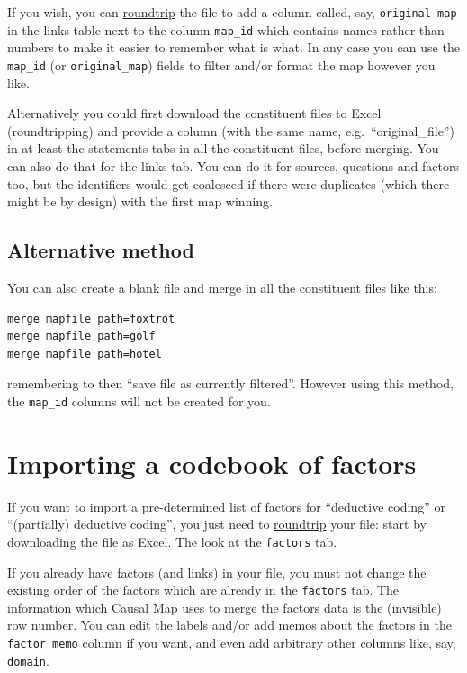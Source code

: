 \documentclass[
]{book}
\begin{document}
If you wish, you can \protect\hyperlink{xroundtripping}{roundtrip} the file to add a column called, say, \texttt{original\ map} in the links table next to the column \texttt{map\_id} which contains names rather than numbers to make it easier to remember what is what. In any case you can use the \texttt{map\_id} (or \texttt{original\_map}) fields to filter and/or format the map however you like.

Alternatively you could first download the constituent files to Excel (roundtripping) and provide a column (with the same name, e.g.~``original\_file'') in at least the statements tabs in all the constituent files, before merging. You can also do that for the links tab. You can do it for sources, questions and factors too, but the identifiers would get coalesced if there were duplicates (which there might be by design) with the first map winning.

\hypertarget{alternative-method}{%
\section{Alternative method}\label{alternative-method}}

You can also create a blank file and merge in all the constituent files like this:

\begin{verbatim}
merge mapfile path=foxtrot
merge mapfile path=golf
merge mapfile path=hotel
\end{verbatim}

remembering to then ``save file as currently filtered''. However using this method, the \texttt{map\_id} columns will not be created for you.

\hypertarget{xcodebook}{%
\chapter{Importing a codebook of factors}\label{xcodebook}}

If you want to import a pre-determined list of factors for ``deductive coding'' or ``(partially) deductive coding'', you just need to \protect\hyperlink{xroundtripping}{roundtrip} your file: start by downloading the file as Excel. The look at the \texttt{factors} tab.

If you already have factors (and links) in your file, you must not change the existing order of the factors which are already in the \texttt{factors} tab. The information which Causal Map uses to merge the factors data is the (invisible) row number. You can edit the labels and/or add memos about the factors in the \texttt{factor\_memo} column if you want, and even add arbitrary other columns like, say, \texttt{domain}.
\end{document}
